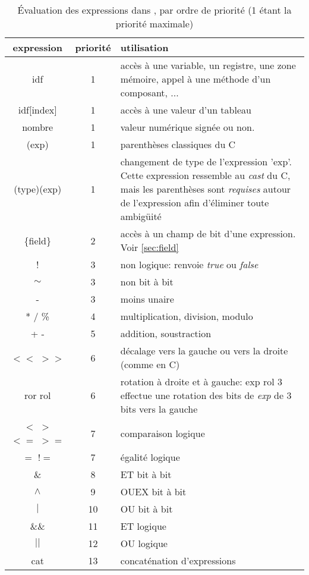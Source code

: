 \begin{table}[!h]
\begin{center}
\begin{tabularx}{\columnwidth}{|c|c|X|}
\hline
\bf expression & \bf priorité & \bf utilisation  \\  \hline
idf & 1 & accès à une variable, un registre, une zone mémoire, appel à une méthode d'un composant, ... \\ \hline
idf[index] & 1 & accès à une valeur d'un tableau \\ \hline
nombre & 1 & valeur numérique signée ou non. \\ \hline
(exp) & 1 & parenthèses classiques du C \\ \hline
(type)(exp) & 1 & changement de type de l'expression 'exp'. Cette expression ressemble au \emph{cast} du C, mais les parenthèses sont \emph{requises} autour de l'expression afin d'éliminer toute ambigüité \\ \hline
\{field\} & 2 & accès à un champ de bit d'une expression. Voir \ref{sec:field} \\ \hline
 ! & 3 &  non logique: renvoie \emph{true} ou \emph{false} \\ \hline
$\sim$  & 3 & non bit à bit \\ \hline
-  & 3 & moins unaire \\ \hline
* / \%  & 4 & multiplication, division, modulo \\ \hline
+ -  & 5 & addition, soustraction \\ \hline
$<<$ $>>$ & 6 & décalage vers la gauche ou vers la droite (comme en C)\\ \hline
ror rol & 6 & rotation à droite et à gauche: exp rol 3 effectue une rotation des bits de \emph{exp} de 3 bits vers la gauche \\ \hline
$<$ $>$ $<=$ $>=$ & 7 & comparaison logique \\ \hline
$=$ $!=$  & 7 & égalité logique \\ \hline
$\&$  & 8 & ET bit à bit \\ \hline
$\wedge$  & 9 & OUEX bit à bit \\ \hline
$|$   & 10 & OU bit à bit \\ \hline
$\&\&$  & 11 & ET logique \\ \hline
$||$   & 12 & OU logique \\ \hline
cat   & 13 & concaténation d'expressions \\ \hline
\end{tabularx}
\caption{\'Evaluation des expressions dans \harmless, par ordre de priorité (1 étant la priorité maximale)}
\label{tab:exp}
\end{center}
\end{table}

